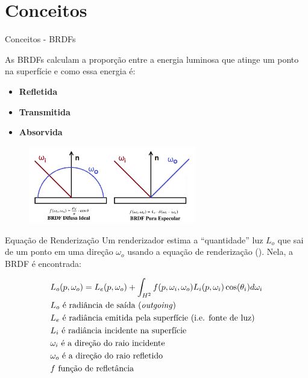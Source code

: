 
\section{Conceitos}

\begin{frame}{Conceitos - BRDFs}

As BRDFs calculam a proporção entre a energia luminosa que atinge um ponto na superfície e como essa energia é:
    \begin{itemize}
        \item \textbf{Refletida}
        \item \textbf{Transmitida}
        \item \textbf{Absorvida}
    \end{itemize}
    \begin{figure}[H]
        \begin{center}
            \includegraphics[width=0.65\textwidth]{./Imagens/difusa-e-specular.png}
        \end{center}
    \end{figure}
\end{frame}


\begin{frame}{Equação de Renderização}
Um renderizador estima a ``quantidade'' luz $L_o$ que sai de um ponto em uma direção ${\omega}_o$ usando a equação de renderização (\cite{rendering_equation}). Nela, a BRDF é encontrada:

\begin{equation}\label{eq-rendering-equation}
\begin{aligned}
  &L_o(p, {\omega}_o) = L_e(p, {\omega}_o) +
\int_{H^2}f(p, {\omega}_i, {\omega}_o){L_i(p,{\omega}_i)\cos(\theta_i)d{\omega}_i}\\
    &L_o \text{ é radiância de saída (\textit{outgoing})}\\
    &L_e \text{ é radiância emitida pela superfície (i.e. fonte de luz)}\\
    &L_i \text{ é radiância incidente na superfície}\\
    &{\omega}_i \text{ é a direção do raio incidente}\\
    &{\omega}_o \text{ é a direção do raio refletido}\\
    &f \text{ função de refletância}\\
\end{aligned}
\end{equation}
\end{frame}



